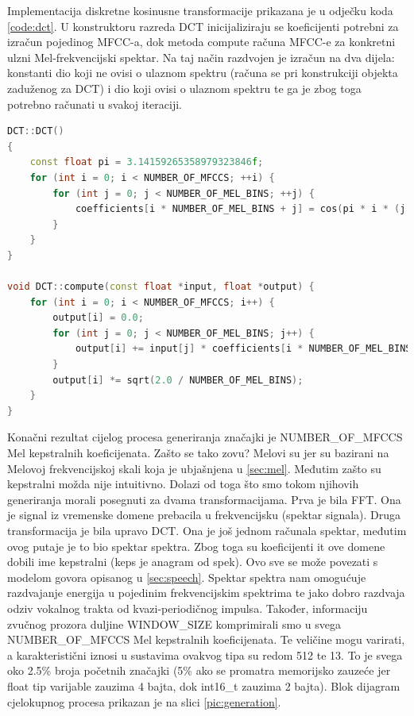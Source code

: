 Implementacija  diskretne kosinusne transformacije prikazana je u odječku koda \ref{code:dct}.
U konstruktoru razreda DCT inicijaliziraju se koeficijenti potrebni za izračun pojedinog MFCC-a,
dok metoda compute računa MFCC-e za konkretni ulzni Mel-frekvencijski spektar. Na taj način
razdvojen je izračun na dva dijela: konstanti dio koji ne ovisi o ulaznom spektru (računa
se pri konstrukciji objekta zaduženog za DCT) i dio koji
ovisi o ulaznom spektru te ga je zbog toga potrebno računati u svakoj iteraciji.\newline{}


\begin{lstlisting}[language=C++, caption=FFT, label=code:dct]
DCT::DCT()
{
    const float pi = 3.14159265358979323846f;
    for (int i = 0; i < NUMBER_OF_MFCCS; ++i) {
        for (int j = 0; j < NUMBER_OF_MEL_BINS; ++j) {
            coefficients[i * NUMBER_OF_MEL_BINS + j] = cos(pi * i * (j + 0.5f) / NUMBER_OF_MEL_BINS);
        }
    }
}

void DCT::compute(const float *input, float *output) {
    for (int i = 0; i < NUMBER_OF_MFCCS; i++) {
        output[i] = 0.0;
        for (int j = 0; j < NUMBER_OF_MEL_BINS; j++) {
            output[i] += input[j] * coefficients[i * NUMBER_OF_MEL_BINS + j];
        }
        output[i] *= sqrt(2.0 / NUMBER_OF_MEL_BINS);
    }
}
\end{lstlisting}

Konačni rezultat cijelog procesa generiranja značajki je NUMBER\_OF\_MFCCS Mel kepstralnih
koeficijenata. Zašto se tako zovu? Melovi su jer su bazirani na Melovoj frekvencijskoj
skali koja je ubjašnjena u \ref{sec:mel}. Međutim zašto su kepstralni možda nije intuitivno.
Dolazi od toga što smo tokom njihovih generiranja morali posegnuti za dvama transformacijama.
Prva je bila FFT. Ona je signal iz vremenske domene prebacila u frekvencijsku (spektar
signala). Druga transformacija je bila upravo DCT. Ona je još jednom računala spektar, međutim
ovog putaje je to bio spektar spektra. Zbog toga su koeficijenti it ove domene dobili ime
kepstralni (keps je anagram od spek). Ovo sve se može povezati s modelom govora opisanog
u \ref{sec:speech}. Spektar spektra nam omogućuje razdvajanje energija u pojedinim 
frekvencijskim spektrima te jako dobro razdvaja odziv vokalnog trakta od kvazi-periodičnog
impulsa. Također, informaciju zvučnog prozora duljine WINDOW\_SIZE komprimirali smo
u svega NUMBER\_OF\_MFCCS Mel kepstralnih koeficijenata. Te veličine mogu varirati, a
karakteristični iznosi u sustavima ovakvog tipa su redom 512 te 13. To je svega oko 2.5\% 
broja početnih značajki (5\% ako se promatra memorijsko zauzeće jer float tip varijable
zauzima 4 bajta, dok int16\_t zauzima 2 bajta). Blok dijagram cjelokupnog procesa prikazan
je na slici \ref{pic:generation}.

